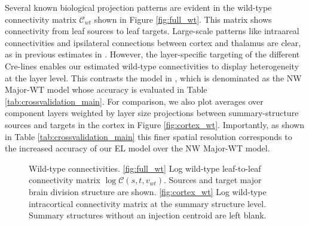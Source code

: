 Several known biological projection patterns are evident in the wild-type connectivity matrix $\mathcal C_{wt}$ shown in Figure \ref{fig:full_wt}.
This matrix shows connectivity from leaf sources to leaf targets.
Large-scale patterns like intraareal connectivities and ipsilateral connections between cortex and thalamus are clear, as in previous estimates in \citet{Oh2014-kh, Knox2019-ot, Harris2019-mr}.
However, the layer-specific targeting of the different Cre-lines enables our estimated wild-type connectivities to display heterogeneity at the layer level.
This contrasts the model in \citet{Knox2019-ot}, which is denominated as the NW Major-WT model whose accuracy is evaluated in Table \ref{tab:crossvalidation_main}.
For comparison, we also plot averages over component layers weighted by layer size projections between summary-structure sources and targets in the cortex in Figure \ref{fig:cortex_wt}.
Importantly, as shown in Table \ref{tab:crossvalidation_main} this finer spatial resolution corresponds to the increased accuracy of our EL model over the NW Major-WT model.

\newpage

\begin{figure}[H]
\centering
        \newline
   \caption{Wild-type connectivities.
   \ref{fig:full_wt} Log wild-type leaf-to-leaf connectivity matrix $\log \mathcal {C} (s,t,v_{wt})$.
   Sources and target major brain division structure are shown.
   \ref{fig:cortex_wt} Log wild-type intracortical connectivity matrix at the summary structure level.
   Summary structures without an injection centroid are left blank.}
   \label{fig:connectome}
\end{figure}

